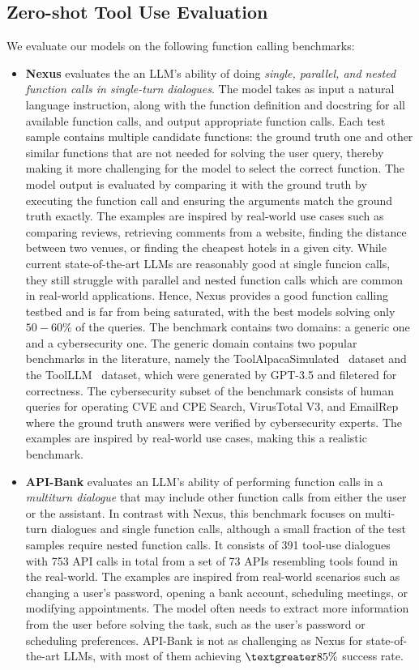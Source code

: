 \subsection{Zero-shot Tool Use Evaluation}\label{appendix:tools_benchmarks}

We evaluate our models on the following function calling benchmarks:
\begin{itemize}
    \item \textbf{Nexus} evaluates the an LLM's ability of doing \textit{single, parallel, and nested function calls in single-turn dialogues}. The model takes as input a natural language instruction, along with the function definition and docstring for all available function calls, and output appropriate function calls. Each test sample contains multiple candidate functions: the ground truth one and other similar functions that are not needed for solving the user query, thereby making it more challenging for the model to select the correct function. The model output is evaluated by comparing it with the ground truth by executing the function call and ensuring the arguments match the ground truth exactly. The examples are inspired by real-world use cases such as comparing reviews, retrieving comments from a website, finding the distance between two venues, or finding the cheapest hotels in a given city. While current state-of-the-art LLMs are reasonably good at single funcion calls, they still struggle with parallel and nested function calls which are common in real-world applications. Hence, Nexus provides a good function calling testbed and is far from being saturated, with the best models solving only $50-60\%$ of the queries. The benchmark contains two domains: a generic one and a cybersecurity one. The generic domain contains two popular benchmarks in the literature, namely the ToolAlpacaSimulated~\citep{tang2306toolalpaca} dataset and the ToolLLM~\citep{qin2023toolllm} dataset, which were generated by GPT-3.5 and filetered for correctness. The cybersecurity subset of the benchmark consists of human queries for operating CVE and CPE Search, VirusTotal V3, and EmailRep where the ground truth answers were verified by cybersecurity experts. The examples are inspired by real-world use cases, making this a realistic benchmark.

    \item \textbf{API-Bank} evaluates an LLM's ability of performing function calls in a \textit{multiturn dialogue} that may include other function calls from either the user or the assistant. In contrast with Nexus, this benchmark focuses on multi-turn dialogues and single function calls, although a small fraction of the test samples require nested function calls. It consists of 391 tool-use dialogues with 753 API calls in total from a set of 73 APIs resembling tools found in the real-world. The examples are inspired from real-world scenarios such as changing a user's password, opening a bank account, scheduling meetings, or modifying appointments. The model often needs to extract more information from the user before solving the task, such as the user's password or scheduling preferences. API-Bank is not as challenging as Nexus for state-of-the-art LLMs, with most of them achieving $\textgreater 85\%$ success rate.


\end{itemize}
